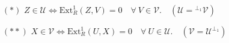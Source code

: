 \documentclass[preview]{standalone}
\begin{document}
\begin{center}
\begin{itemize} \item[$(\ast)$] $Z\in\mathcal{U} \Leftrightarrow \text{Ext}^1_R(Z,V)=0 \quad \forall \ V\in\mathcal{V}. \quad (\mathcal{U} = {}^{\perp_1}\mathcal{V})$ \item[$(\ast\ast)$] $X\in\mathcal{V} \Leftrightarrow \text{Ext}^1_R(U,X)=0 \quad \forall \ U\in\mathcal{U}. \quad (\mathcal{V} = \mathcal{U}^{\perp_1} )$ \end{itemize}
\end{center}
\end{document}
